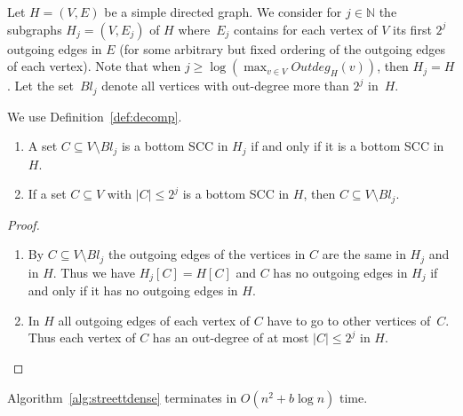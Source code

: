 \documentclass[11pt,letterpaper]{article}
\newcommand{\lu}{\textup{(}}
\newcommand{\ru}{\textup{)}\xspace}
\newcommand{\upbr}[1]{\lu #1\ru}
\newcommand{\scc}{C\xspace}
\newcommand{\blue}{\mathit{Bl}}
\newcommand{\OutDeg}{\mathit{Outdeg}}
\begin{document}
\begin{definition}\label{def:decomp}
Let $H = (V,E)$ be a simple directed graph. We consider for $j \in \mathbb{N}$ 
the subgraphs $H_j = (V, E_j)$ of $H$ where~$E_j$ contains for 
each vertex of $V$ its first $2^j$ outgoing edges in $E$ \upbr{for some arbitrary but
fixed ordering of the outgoing edges of each vertex}. Note that when
$j \ge \log (\max_{v \in V}{\OutDeg_H(v)})$, then $H_j = H$.
Let the set~$\blue_j$ denote all vertices with out-degree more than $2^j$ in~$H$.
\end{definition}

\begin{lemma}\label{lem:decomp}
We use Definition~\ref{def:decomp}.
\begin{enumerate}
	\item A set $\scc \subseteq V \setminus \blue_j$ is a bottom SCC in $H_j$
	if and only if it is a bottom SCC in~$H$.
	\item If a set $\scc \subseteq V$ with $\lvert \scc \rvert \le 2^j$
	is a bottom SCC in $H$, then $\scc \subseteq V \setminus \blue_j$.
\end{enumerate}
\end{lemma}
\begin{proof}
\begin{enumerate}
	\item
	By $\scc \subseteq V \setminus \blue_j$ the outgoing edges of the vertices in $\scc$
	are the same in $H_j$ and in $H$. Thus we have $H_j[\scc] = H[\scc]$
	and $\scc$ has no outgoing edges in $H_j$ if and only if it has no outgoing 
	edges in $H$.
	\item
	In $H$ all outgoing edges of each vertex of $\scc$ have to go to other vertices 
	of~$\scc$. Thus each vertex of $\scc$ has an 
	out-degree of at most $\lvert \scc \rvert \le 2^j$ in $H$.\qedhere
\end{enumerate}
\end{proof}

\begin{proposition}
		Algorithm~\ref{alg:streettdense} terminates in $O(n^2 + b \log n)$ time.
\end{proposition}
\end{document}
